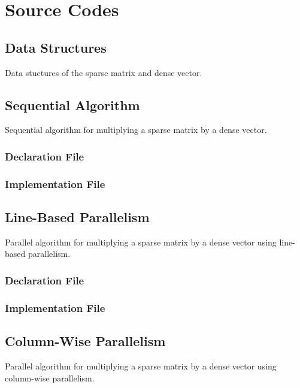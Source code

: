 \documentclass[12pt,oneside]{book} %
\begin{document}
\chapter{Source Codes}
\begin{subappendices}
    \section{Data Structures}\label{appendix:data-structures}
    Data stuctures of the sparse matrix and dense vector.
    
    
    \newpage

    \section{Sequential Algorithm}\label{appendix:sequential}
    Sequential algorithm for multiplying a sparse matrix by a dense vector.
    \subsection{Declaration File}
    
    \subsection{Implementation File}
    

    \section{Line-Based Parallelism}\label{appendix:line-based}
    Parallel algorithm for multiplying a sparse matrix by a dense vector using line-based parallelism.
    \subsection{Declaration File}
    
    \subsection{Implementation File}
    

    \section{Column-Wise Parallelism}\label{appendix:column-based}
    Parallel algorithm for multiplying a sparse matrix by a dense vector using column-wise parallelism.

\end{subappendices}
\end{document}
